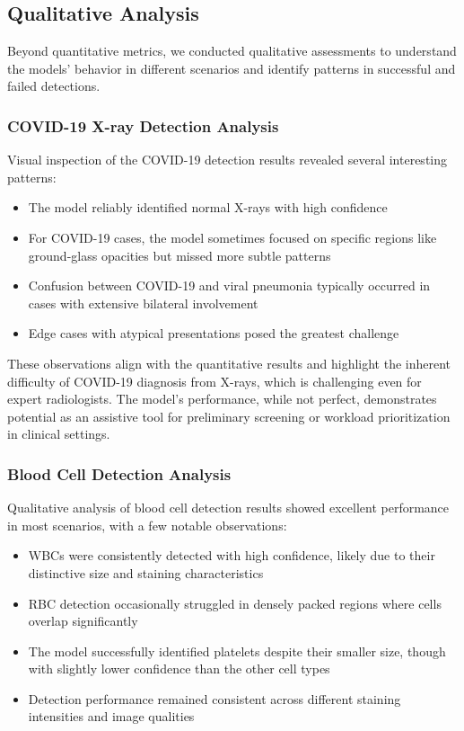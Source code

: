 \begin{multicols}{2}
\subsection{Qualitative Analysis}

Beyond quantitative metrics, we conducted qualitative assessments to understand the models' behavior in different scenarios and identify patterns in successful and failed detections.

\subsubsection{COVID-19 X-ray Detection Analysis}

Visual inspection of the COVID-19 detection results revealed several interesting patterns:

\begin{itemize}
    \item The model reliably identified normal X-rays with high confidence
    \item For COVID-19 cases, the model sometimes focused on specific regions like ground-glass opacities but missed more subtle patterns
    \item Confusion between COVID-19 and viral pneumonia typically occurred in cases with extensive bilateral involvement
    \item Edge cases with atypical presentations posed the greatest challenge
\end{itemize}

These observations align with the quantitative results and highlight the inherent difficulty of COVID-19 diagnosis from X-rays, which is challenging even for expert radiologists. The model's performance, while not perfect, demonstrates potential as an assistive tool for preliminary screening or workload prioritization in clinical settings.

\subsubsection{Blood Cell Detection Analysis}

Qualitative analysis of blood cell detection results showed excellent performance in most scenarios, with a few notable observations:

\begin{itemize}
    \item WBCs were consistently detected with high confidence, likely due to their distinctive size and staining characteristics
    \item RBC detection occasionally struggled in densely packed regions where cells overlap significantly
    \item The model successfully identified platelets despite their smaller size, though with slightly lower confidence than the other cell types
    \item Detection performance remained consistent across different staining intensities and image qualities
\end{itemize}


\end{multicols}
